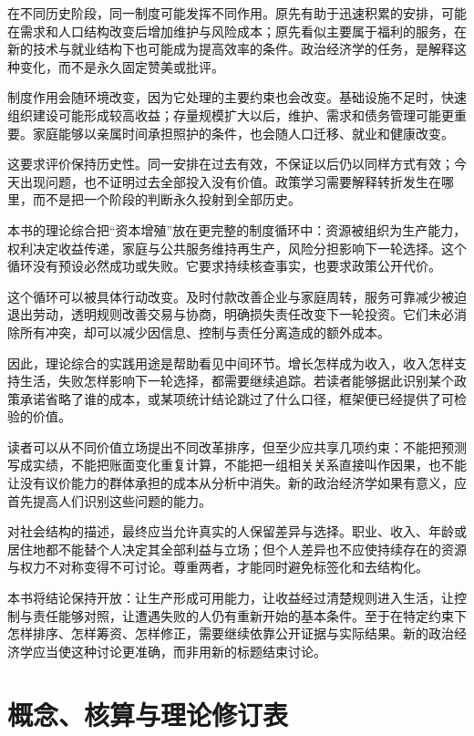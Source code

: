 \documentclass[UTF8,fontset=fandol,zihao=-4,oneside,openany]{ctexbook}
\begin{document}
在不同历史阶段，同一制度可能发挥不同作用。原先有助于迅速积累的安排，可能在需求和人口结构改变后增加维护与风险成本；原先看似主要属于福利的服务，在新的技术与就业结构下也可能成为提高效率的条件。政治经济学的任务，是解释这种变化，而不是永久固定赞美或批评。

\label{arg:P289}
制度作用会随环境改变，因为它处理的主要约束也会改变。基础设施不足时，快速组织建设可能形成较高收益；存量规模扩大以后，维护、需求和债务管理可能更重要。家庭能够以亲属时间承担照护的条件，也会随人口迁移、就业和健康改变。

这要求评价保持历史性。同一安排在过去有效，不保证以后仍以同样方式有效；今天出现问题，也不证明过去全部投入没有价值。政策学习需要解释转折发生在哪里，而不是把一个阶段的判断永久投射到全部历史。

本书的理论综合把“资本增殖”放在更完整的制度循环中：资源被组织为生产能力，权利决定收益传递，家庭与公共服务维持再生产，风险分担影响下一轮选择。这个循环没有预设必然成功或失败。它要求持续核查事实，也要求政策公开代价。

\label{arg:P290}
这个循环可以被具体行动改变。及时付款改善企业与家庭周转，服务可靠减少被迫退出劳动，透明规则改善交易与协商，明确损失责任改变下一轮投资。它们未必消除所有冲突，却可以减少因信息、控制与责任分离造成的额外成本。

因此，理论综合的实践用途是帮助看见中间环节。增长怎样成为收入，收入怎样支持生活，失败怎样影响下一轮选择，都需要继续追踪。若读者能够据此识别某个政策承诺省略了谁的成本，或某项统计结论跳过了什么口径，框架便已经提供了可检验的价值。

读者可以从不同价值立场提出不同改革排序，但至少应共享几项约束：不能把预测写成实绩，不能把账面变化重复计算，不能把一组相关关系直接叫作因果，也不能让没有议价能力的群体承担的成本从分析中消失。新的政治经济学如果有意义，应首先提高人们识别这些问题的能力。

\label{arg:P291}
对社会结构的描述，最终应当允许真实的人保留差异与选择。职业、收入、年龄或居住地都不能替个人决定其全部利益与立场；但个人差异也不应使持续存在的资源与权力不对称变得不可讨论。尊重两者，才能同时避免标签化和去结构化。

本书将结论保持开放：让生产形成可用能力，让收益经过清楚规则进入生活，让控制与责任能够对照，让遭遇失败的人仍有重新开始的基本条件。至于在特定约束下怎样排序、怎样筹资、怎样修正，需要继续依靠公开证据与实际结果。新的政治经济学应当使这种讨论更准确，而非用新的标题结束讨论。


\appendix
\chapter{概念、核算与理论修订表}
\end{document}
